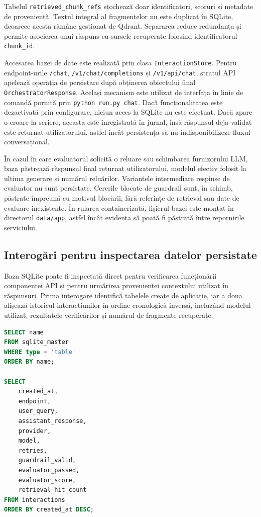 \documentclass[12pt, a4paper, oneside, romanian]{teza-upb}
\begin{document}
Tabelul \texttt{retrieved\_chunk\_refs} stochează doar identificatori, scoruri și metadate de proveniență. Textul integral al fragmentelor nu este duplicat în SQLite, deoarece acesta rămâne gestionat de Qdrant. Separarea reduce redundanța și permite asocierea unui răspuns cu sursele recuperate folosind identificatorul \texttt{chunk\_id}.

Accesarea bazei de date este realizată prin clasa \texttt{InteractionStore}. Pentru endpoint-urile \texttt{/chat}, \texttt{/v1/chat/completions} și \texttt{/v1/api/chat}, stratul API apelează operația de persistare după obținerea obiectului final \texttt{OrchestratorResponse}. Același mecanism este utilizat de interfața în linie de comandă pornită prin \texttt{python run.py chat}. Dacă funcționalitatea este dezactivată prin configurare, niciun acces la SQLite nu este efectuat. Dacă apare o eroare la scriere, aceasta este înregistrată în jurnal, însă răspunsul deja validat este returnat utilizatorului, astfel încât persistența să nu indisponibilizeze fluxul conversațional.

În cazul în care evaluatorul solicită o reluare sau schimbarea furnizorului LLM, baza păstrează răspunsul final returnat utilizatorului, modelul efectiv folosit la ultima generare și numărul reluărilor. Variantele intermediare respinse de evaluator nu sunt persistate. Cererile blocate de guardrail sunt, în schimb, păstrate împreună cu motivul blocării, fără referințe de retrieval sau date de evaluare inexistente. În rularea containerizată, fișierul bazei este montat în directorul \texttt{data/app}, astfel încât evidența să poată fi păstrată între repornirile serviciului.

\subsection{Interogări pentru inspectarea datelor persistate}

Baza SQLite poate fi inspectată direct pentru verificarea funcționării componentei API și pentru urmărirea provenienței contextului utilizat în răspunsuri. Prima interogare identifică tabelele create de aplicație, iar a doua afișează istoricul interacțiunilor în ordine cronologică inversă, incluzând modelul utilizat, rezultatele verificărilor și numărul de fragmente recuperate.
\renewcommand{\lstlistingname}{Cod}
\begin{center}
\begin{minipage}{0.64\textwidth}
\begin{lstlisting}[language=SQL, caption={Listarea tabelelor și inspectarea interacțiunilor persistate}]
SELECT name
FROM sqlite_master
WHERE type = 'table'
ORDER BY name;

SELECT
    created_at,
    endpoint,
    user_query,
    assistant_response,
    provider,
    model,
    retries,
    guardrail_valid,
    evaluator_passed,
    evaluator_score,
    retrieval_hit_count
FROM interactions
ORDER BY created_at DESC;
\end{lstlisting}
\end{minipage}
\end{center}
\end{document}
